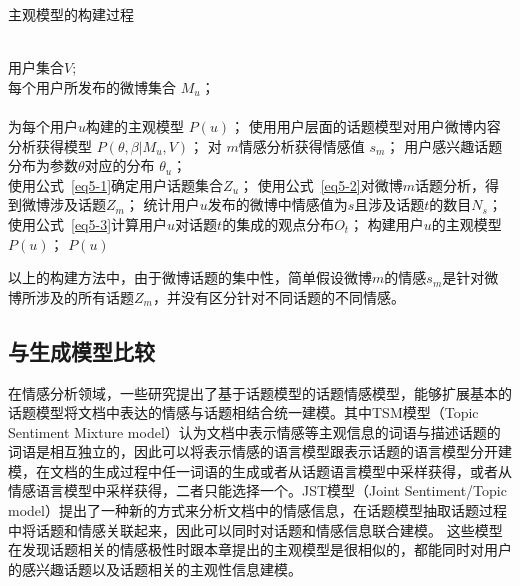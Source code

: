 \begin{algorithm}[htb] 
\caption{主观模型的构建过程} 
\label{alg5-1}
\begin{algorithmic}[1] %
\REQUIRE ~~\\ %
用户集合$ V $;\\
每个用户所发布的微博集合 $ M_{u} $；\\
\ENSURE ~~\\ %
为每个用户$ u $构建的主观模型 $ P(u) $；
\STATE 使用用户层面的话题模型对用户微博内容分析获得模型 $P(\theta,\beta|M_{u},V)$； 
\label{ alg1:topic }%
\label{alg1:sentiment}
\STATE 对 $ m $情感分析获得情感值 $ s_{m} $；
\ENDFOR
{}
\STATE 用户感兴趣话题分布为参数$ \theta $对应的分布 $ \theta_{u} $；\\
\STATE 使用公式~\ref{eq5-1}确定用户话题集合$ Z_{u}$；
\ENDFOR
{}
\STATE 使用公式~\ref{eq5-2}对微博$ m $话题分析，得到微博涉及话题$ Z_m $；
\ENDFOR
{}
\STATE 统计用户$ u $发布的微博中情感值为$ s $且涉及话题$ t $的数目$ N_{s}$；
\ENDFOR
\STATE 使用公式~\ref{eq5-3}计算用户$ u $对话题$ t $的集成的观点分布$ O_t $；
\ENDFOR
\STATE 构建用户$ u $的主观模型$  P(u)$；
\RETURN $P(u)$ %
\end{algorithmic}
\end{algorithm}

以上的构建方法中，由于微博话题的集中性，简单假设微博$ m $的情感$ s_m $是针对微博所涉及的所有话题$ Z_{m} $，并没有区分针对不同话题的不同情感。

\subsection{与生成模型比较}
\label{comparison}
在情感分析领域，一些研究提出了基于话题模型的话题情感模型，能够扩展基本的话题模型将文档中表达的情感与话题相结合统一建模。其中TSM模型（Topic Sentiment Mixture model）认为文档中表示情感等主观信息的词语与描述话题的词语是相互独立的，因此可以将表示情感的语言模型跟表示话题的语言模型分开建模，在文档的生成过程中任一词语的生成或者从话题语言模型中采样获得，或者从情感语言模型中采样获得，二者只能选择一个。JST模型（Joint Sentiment/Topic model）提出了一种新的方式来分析文档中的情感信息，在话题模型抽取话题过程中将话题和情感关联起来，因此可以同时对话题和情感信息联合建模。
这些模型在发现话题相关的情感极性时跟本章提出的主观模型是很相似的，都能同时对用户的感兴趣话题以及话题相关的主观性信息建模。


